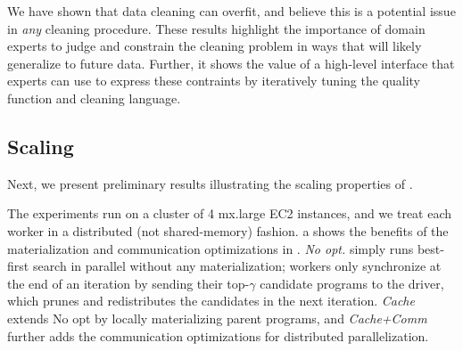  We have shown that data cleaning can overfit, and believe this is a potential issue in {\it any} cleaning procedure. These results highlight the importance of domain experts to judge and constrain the cleaning problem in ways that will likely generalize to future data. Further, it shows the value of a high-level interface that experts can use to express these contraints by iteratively tuning the quality function and cleaning language. 



\subsection*{Scaling}
Next, we present preliminary results illustrating the scaling properties of \sys. 

\vspace{1em}

 The experiments run on a cluster of 4 mx.large EC2 instances, and we treat each worker in a distributed (not shared-memory) fashion.   a shows the benefits of the materialization and communication optimizations in .  {\it No opt.} simply runs best-first search in parallel without any materialization; workers only synchronize at the end of an iteration by sending their top-$\gamma$ candidate programs to the driver, which prunes and redistributes the candidates in the next iteration.  {\it Cache} extends No opt by locally materializing parent programs, and {\it Cache+Comm} further adds the communication optimizations for distributed parallelization.   

